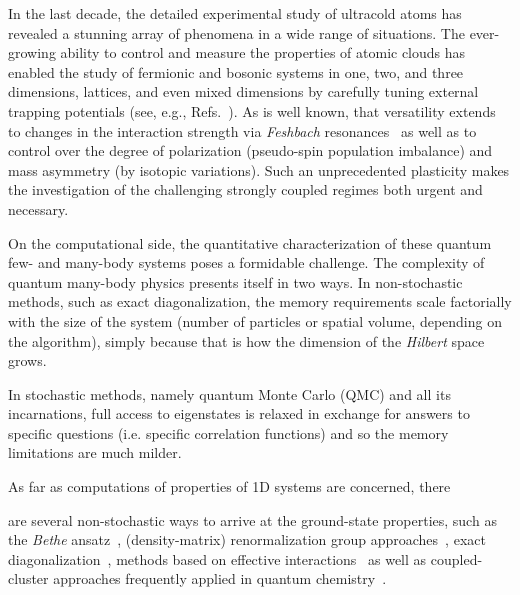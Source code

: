 \documentclass[pra,aps,groupedaddress,floatfix,twocolumn,superscriptaddress,showpacs,nofootinbib]{revtex4-1}
\begin{document}
In the last decade, the detailed experimental study of ultracold atoms has revealed a
stunning array of phenomena {in a wide range} of situations.
The ever-growing ability to control and measure the properties of atomic clouds has enabled the study of fermionic and bosonic systems in
one, two, and three dimensions, lattices, and even mixed dimensions
{by carefully tuning external trapping potentials (see, e.g., Refs.~\cite{coldAtomsReview, expTrap1D2D, Nature1DTraps}).}
As is well known, that versatility extends to changes in the interaction strength via
{\it Feshbach} resonances~\cite{JETFeshbach} as well
as to control over the degree of polarization (pseudo-spin population imbalance) and mass asymmetry (by isotopic variations).
Such an unprecedented plasticity makes the investigation of the challenging strongly coupled regimes both urgent {and necessary.}

On the computational side, the quantitative
characterization of these quantum few- and many-body systems poses a formidable challenge. The complexity of quantum many-body
physics presents itself in two ways. In non-stochastic methods, such as exact diagonalization, the memory requirements scale
{factorially} with the size
of the system (number of particles or spatial volume, depending on the algorithm), simply
because that is how the dimension of the
{\it Hilbert} space grows.
{In stochastic methods, namely quantum Monte Carlo (QMC) and all its incarnations, full access to
eigenstates is relaxed in exchange for answers to specific
questions (i.e. specific
correlation functions) and so the memory limitations are much milder.

As far as computations of properties of 1D systems are concerned, there}
are several non-stochastic ways to arrive at the ground-state properties, such as the {\it Bethe} ansatz~\cite{2013RvMP...85.1633G},
(density-matrix) renormalization group approaches~\cite{Voit,*RevModPhys.77.259}, exact diagonalization~\cite{PhysRevA.88.033607,*0295-5075-109-2-26005,*PhysRevA.94.042118}, methods based on effective interactions~\cite{1367-2630-16-6-063003}
as well as coupled-cluster approaches frequently applied in quantum chemistry~\cite{1367-2630-17-11-115001}.
\end{document}
